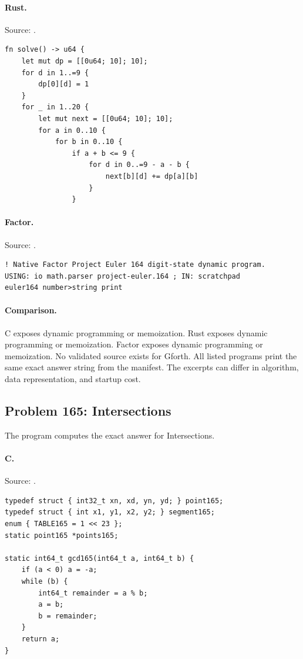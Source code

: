 \paragraph{Rust.} Source: .
\begin{lstlisting}
fn solve() -> u64 {
    let mut dp = [[0u64; 10]; 10];
    for d in 1..=9 {
        dp[0][d] = 1
    }
    for _ in 1..20 {
        let mut next = [[0u64; 10]; 10];
        for a in 0..10 {
            for b in 0..10 {
                if a + b <= 9 {
                    for d in 0..=9 - a - b {
                        next[b][d] += dp[a][b]
                    }
                }
\end{lstlisting}

\paragraph{Factor.} Source: .
\begin{lstlisting}
! Native Factor Project Euler 164 digit-state dynamic program.
USING: io math.parser project-euler.164 ; IN: scratchpad
euler164 number>string print
\end{lstlisting}

\paragraph{Comparison.}
C exposes dynamic programming or memoization. Rust exposes dynamic programming or memoization. Factor exposes dynamic programming or memoization.
No validated source exists for Gforth.
All listed programs print the same exact answer string from the manifest. The excerpts can differ in algorithm, data representation, and startup cost.

\subsection{Problem 165: Intersections}
\label{walkthrough:p165}
The program computes the exact answer for Intersections.

\paragraph{C.} Source: .
\begin{lstlisting}
typedef struct { int32_t xn, xd, yn, yd; } point165;
typedef struct { int x1, y1, x2, y2; } segment165;
enum { TABLE165 = 1 << 23 };
static point165 *points165;

static int64_t gcd165(int64_t a, int64_t b) {
    if (a < 0) a = -a;
    while (b) {
        int64_t remainder = a % b;
        a = b;
        b = remainder;
    }
    return a;
}
\end{lstlisting}

